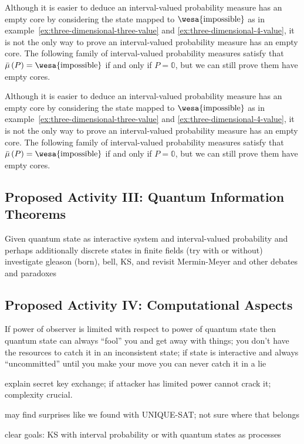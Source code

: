 \documentclass{article}
\theoremstyle{remark}
\newcommand{\imposs}{{\mbox{\wesa{impossible}}}}
\begin{document}
Although it is easier to deduce an interval-valued probability measure
has an empty core by considering the state mapped to $\imposs$ as
in example~\ref{ex:three-dimensional-three-value} and \ref{ex:three-dimensional-4-value},
it is not the only way to prove an interval-valued probability measure
has an empty core. The following family of interval-valued probability
measures satisfy that $\bar{\mu}\left(P\right)=\imposs$ if and only
if $P=\mathbb{0}$, but we can still prove them have empty cores.

Although it is easier to deduce an interval-valued probability measure
has an empty core by considering the state mapped to $\imposs$ as
in example~\ref{ex:three-dimensional-three-value} and \ref{ex:three-dimensional-4-value},
it is not the only way to prove an interval-valued probability measure
has an empty core. The following family of interval-valued probability
measures satisfy that $\bar{\mu}\left(P\right)=\imposs$ if and only
if $P=\mathbb{0}$, but we can still prove them have empty cores.

\subsection{Proposed Activity III: Quantum Information Theorems} 

Given quantum state as interactive system
and interval-valued probability
and perhaps additionally discrete states in finite fields (try with or without)
investigate gleason (born), bell, KS, and revisit Mermin-Meyer and
other debates and paradoxes

\subsection{Proposed Activity IV: Computational Aspects}

If power of observer is limited with respect to power of quantum state
then quantum state can always ``fool'' you and get away with things;
you don't have the resources to catch it in an inconsistent state; if
state is interactive and always ``uncommitted'' until you make your
move you can never catch it in a lie

explain secret key exchange; if attacker has limited power cannot
crack it; complexity crucial.

may find surprises like we found with UNIQUE-SAT; not sure where that belongs 

clear goals: KS with interval probability or with quantum states as
processes
\end{document}

